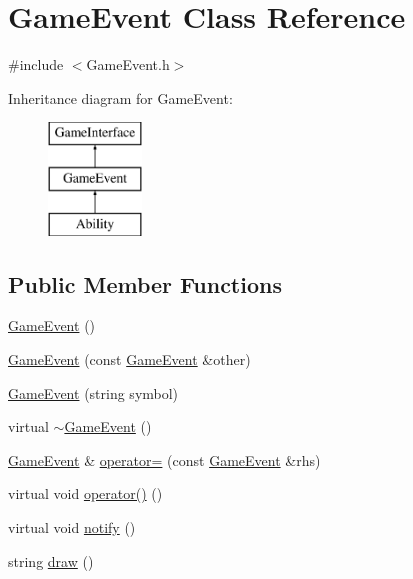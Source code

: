 \hypertarget{class_game_event}{\section{Game\-Event Class Reference}
\label{class_game_event}
}


{\ttfamily \#include $<$Game\-Event.\-h$>$}

Inheritance diagram for Game\-Event\-:\begin{figure}[H]
\begin{center}
\leavevmode
\includegraphics[height=3.000000cm]{class_game_event}
\end{center}
\end{figure}
\subsection*{Public Member Functions}
\begin{DoxyCompactItemize}
\item 
\hyperlink{class_game_event_a0a8133b65ffc98712879d18186ef3020}{Game\-Event} ()
\item 
\hyperlink{class_game_event_a7687b9408418c93c76af200475be6e2e}{Game\-Event} (const \hyperlink{class_game_event}{Game\-Event} \&other)
\item 
\hyperlink{class_game_event_a8a164c0919549846f667d7b0e9b80a72}{Game\-Event} (string symbol)
\item 
virtual \hyperlink{class_game_event_aaf514ed35c80bbbcc54ce411d9d71eef}{$\sim$\-Game\-Event} ()
\item 
\hyperlink{class_game_event}{Game\-Event} \& \hyperlink{class_game_event_a1b0fd750f2e764b1f47ac4c3fda27ebc}{operator=} (const \hyperlink{class_game_event}{Game\-Event} \&rhs)
\item 
virtual void \hyperlink{class_game_event_a0d21300957e0a82e4fcfdd7dd8ad9449}{operator()} ()
\item 
virtual void \hyperlink{class_game_event_a2effcb2226837b007cfb27defbd5658e}{notify} ()
\item 
string \hyperlink{class_game_event_a5013426766329f47e7eb0d2f88dbd8df}{draw} ()
\end{DoxyCompactItemize}
